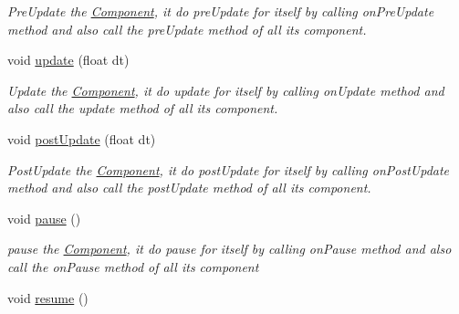 \begin{DoxyCompactItemize}
\begin{DoxyCompactList}\small\item\em Pre\+Update the \hyperlink{class_magnum_1_1_component}{Component}, it do pre\+Update for itself by calling on\+Pre\+Update method and also call the pre\+Update method of all its component. \end{DoxyCompactList}\item 
void \hyperlink{class_magnum_1_1_component_1_1_owner_a2a5903c026526f83cfd5d0d808a3eecc}{update} (float dt)\hypertarget{class_magnum_1_1_component_1_1_owner_a2a5903c026526f83cfd5d0d808a3eecc}{}\label{class_magnum_1_1_component_1_1_owner_a2a5903c026526f83cfd5d0d808a3eecc}

\begin{DoxyCompactList}\small\item\em Update the \hyperlink{class_magnum_1_1_component}{Component}, it do update for itself by calling on\+Update method and also call the update method of all its component. \end{DoxyCompactList}\item 
void \hyperlink{class_magnum_1_1_component_1_1_owner_a8f796ed8887766aa49673abcffcba82f}{post\+Update} (float dt)\hypertarget{class_magnum_1_1_component_1_1_owner_a8f796ed8887766aa49673abcffcba82f}{}\label{class_magnum_1_1_component_1_1_owner_a8f796ed8887766aa49673abcffcba82f}

\begin{DoxyCompactList}\small\item\em Post\+Update the \hyperlink{class_magnum_1_1_component}{Component}, it do post\+Update for itself by calling on\+Post\+Update method and also call the post\+Update method of all its component. \end{DoxyCompactList}\item 
void \hyperlink{class_magnum_1_1_component_1_1_owner_a75d6556ec96115c162786b106e487f0a}{pause} ()\hypertarget{class_magnum_1_1_component_1_1_owner_a75d6556ec96115c162786b106e487f0a}{}\label{class_magnum_1_1_component_1_1_owner_a75d6556ec96115c162786b106e487f0a}

\begin{DoxyCompactList}\small\item\em pause the \hyperlink{class_magnum_1_1_component}{Component}, it do pause for itself by calling on\+Pause method and also call the on\+Pause method of all its component \end{DoxyCompactList}\item 
void \hyperlink{class_magnum_1_1_component_1_1_owner_ac2287e82a71a7d62586b09b1ec9d1280}{resume} ()\hypertarget{class_magnum_1_1_component_1_1_owner_ac2287e82a71a7d62586b09b1ec9d1280}{}\label{class_magnum_1_1_component_1_1_owner_ac2287e82a71a7d62586b09b1ec9d1280}


\end{DoxyCompactItemize}

